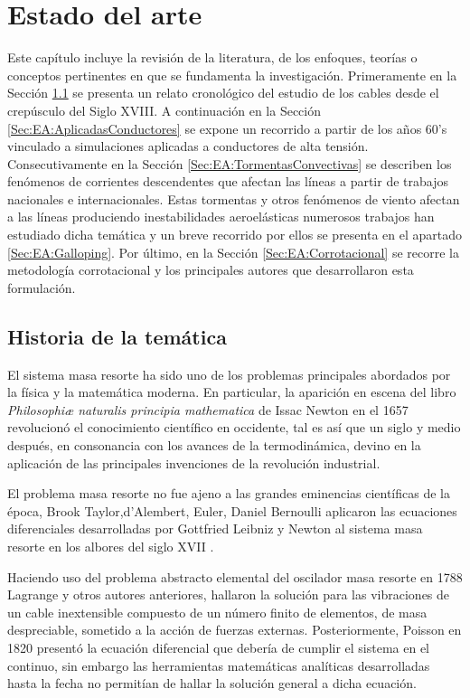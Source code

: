 \chapter{Estado del arte}\label{Cap:EstadoDelArte}\linenumbers

Este capítulo incluye la revisión de la literatura, de los enfoques, teorías o conceptos pertinentes en que se fundamenta la investigación. Primeramente en la Sección \ref{Sec:EA:Historia} se presenta un relato cronológico del estudio de los cables desde el crepúsculo del Siglo XVIII. A continuación en la Sección \ref{Sec:EA:AplicadasConductores} se expone un recorrido a partir de los años 60's vinculado a simulaciones aplicadas a conductores de alta tensión. Consecutivamente en la Sección \ref{Sec:EA:TormentasConvectivas} se describen los fenómenos de corrientes descendentes que afectan las líneas a partir de trabajos nacionales e internacionales. Estas tormentas y otros fenómenos de viento afectan a las líneas produciendo inestabilidades aeroelásticas numerosos trabajos han estudiado dicha temática y un breve recorrido por ellos se presenta en el apartado \ref{Sec:EA:Galloping}. Por último, en la Sección \ref{Sec:EA:Corrotacional} se recorre la metodología corrotacional y los principales autores que desarrollaron esta formulación. 

\section{Historia de la temática}\label{Sec:EA:Historia}
El sistema masa resorte ha sido uno de los problemas principales abordados por la física y la matemática moderna. En particular, la aparición en escena del libro \emph{Philosophiæ naturalis principia mathematica} de Issac Newton en el 1657 revolucionó el conocimiento científico en occidente, tal es así que  un siglo y medio después, en consonancia con los avances de la termodinámica, devino en la aplicación de las principales invenciones de la revolución industrial.

El problema masa resorte no fue ajeno a las grandes eminencias científicas de la época, Brook Taylor,d'Alembert, Euler, Daniel Bernoulli aplicaron las ecuaciones diferenciales desarrolladas por Gottfried Leibniz y Newton al sistema masa resorte en los albores del siglo XVII \citep{Starossek1991}.  

Haciendo uso del problema abstracto elemental del oscilador masa resorte en 1788 Lagrange y otros autores anteriores, hallaron la solución para las vibraciones de un cable inextensible compuesto de un número finito de elementos, de masa despreciable, sometido a la acción de fuerzas externas. Posteriormente, Poisson en 1820 presentó la ecuación diferencial que debería de cumplir el sistema en el continuo, sin embargo las herramientas matemáticas analíticas desarrolladas hasta la fecha no permitían de hallar la solución general a dicha ecuación.\citep{Irvine1974}

